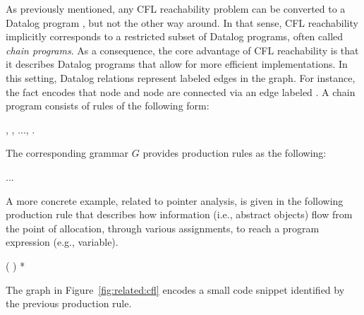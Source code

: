 As previously mentioned, any CFL reachability problem can be converted to a Datalog program \cite{article:1998:Reps}, but not the other way around. In that sense, CFL reachability implicitly corresponds to a restricted subset of Datalog programs, often called \emph{chain programs}. As a consequence, the core advantage of CFL reachability is that it describes Datalog programs that allow for more efficient implementations. In this setting, Datalog relations represent labeled edges in the graph. For instance, the fact  encodes that node  and node  are connected via an edge labeled . A chain program consists of rules of the following form:

\begin{displayquote}
\begin{datalog}
 \dlIf{} , , ..., .
\end{datalog}
\end{displayquote}

The corresponding grammar $G$ provides production rules as the following:

\begin{displayquote}
\begin{datalog}
 \dlIfInv{}   ... 
\end{datalog}
\end{displayquote}

A more concrete example, related to pointer analysis, is given in the following production rule that describes how information (i.e., abstract objects) flow from the point of allocation, through various assignments, to reach a program expression (e.g., variable).

\begin{displayquote}
\begin{datalog}
 \dlIfInv{}  (  ) *
\end{datalog}
\end{displayquote}

The graph in Figure~\ref{fig:related:cfl} encodes a small code snippet identified by the previous production rule.

